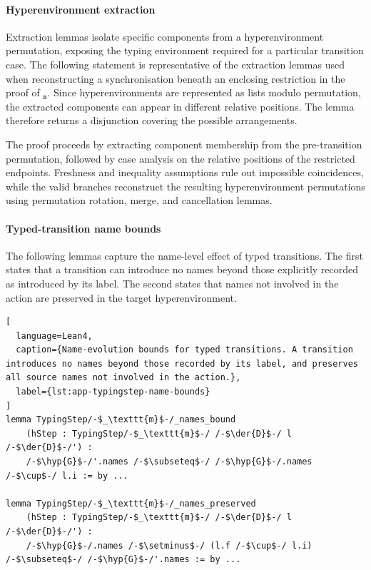 \paragraph{Hyperenvironment extraction}
Extraction lemmas isolate specific components from a hyperenvironment permutation, exposing the typing environment required for a particular transition case. The following statement is representative of the extraction lemmas used when reconstructing a  synchronisation beneath an enclosing restriction in the proof of $_{\texttt{m}}$. Since hyperenvironments are represented as lists modulo permutation, the extracted components can appear in different relative positions. The lemma therefore returns a disjunction covering the possible arrangements.

The proof proceeds by extracting component membership from the pre-transition permutation, followed by case analysis on the relative positions of the restricted endpoints. Freshness and inequality assumptions rule out impossible coincidences, while the valid branches reconstruct the resulting hyperenvironment permutations using permutation rotation, merge, and cancellation lemmas.

\paragraph{Typed-transition name bounds} The following lemmas capture the name-level effect of typed transitions. The first states that a transition can introduce no names beyond those explicitly recorded as introduced by its label. The second states that names not involved in the action are preserved in the target hyperenvironment.

\begin{lstlisting}[
  language=Lean4,
  caption={Name-evolution bounds for typed transitions. A transition introduces no names beyond those recorded by its label, and preserves all source names not involved in the action.},
  label={lst:app-typingstep-name-bounds}
]
lemma TypingStep/-$_\texttt{m}$-/_names_bound
    (hStep : TypingStep/-$_\texttt{m}$-/ /-$\der{D}$-/ l /-$\der{D}$-/') :
    /-$\hyp{G}$-/'.names /-$\subseteq$-/ /-$\hyp{G}$-/.names /-$\cup$-/ l.i := by ...

lemma TypingStep/-$_\texttt{m}$-/_names_preserved
    (hStep : TypingStep/-$_\texttt{m}$-/ /-$\der{D}$-/ l /-$\der{D}$-/') :
    /-$\hyp{G}$-/.names /-$\setminus$-/ (l.f /-$\cup$-/ l.i) /-$\subseteq$-/ /-$\hyp{G}$-/'.names := by ...
\end{lstlisting}

